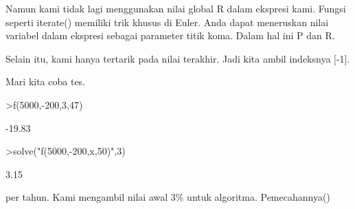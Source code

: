 \documentclass[a4paper,10pt]{article}
\begin{document}
\begin{eulernotebook}
\begin{eulercomment}
\begin{eulercomment}
\begin{eulercomment}
\begin{eulercomment}
\begin{eulercomment}
\begin{eulercomment}
\begin{eulercomment}
\begin{eulercomment}
\begin{eulercomment}
\begin{eulercomment}
\begin{eulercomment}
\begin{eulercomment}
\begin{eulercomment}
\begin{eulercomment}
\begin{eulercomment}
\begin{eulercomment}
\begin{eulercomment}
\begin{eulercomment}
\begin{eulercomment}
\begin{eulercomment}
\begin{eulercomment}
\begin{eulercomment}
\begin{eulercomment}
\begin{eulercomment}
\begin{eulercomment}
\begin{eulercomment}
\begin{eulercomment}
\begin{eulercomment}
\begin{eulercomment}
\begin{eulercomment}
\begin{eulercomment}
\begin{eulercomment}
\begin{eulercomment}
\begin{eulercomment}
\begin{eulercomment}
Namun kami tidak lagi menggunakan nilai global R dalam ekspresi kami.
Fungsi seperti iterate() memiliki trik khusus di Euler. Anda dapat
meneruskan nilai variabel dalam ekspresi sebagai parameter titik koma.
Dalam hal ini P dan R.

Selain itu, kami hanya tertarik pada nilai terakhir. Jadi kita ambil
indeksnya [-1].

Mari kita coba tes.
\end{eulercomment}
\begin{eulerprompt}
>f(5000,-200,3,47)
\end{eulerprompt}
\begin{euleroutput}
       -19.83 
\end{euleroutput}
\begin{eulerprompt}
>solve("f(5000,-200,x,50)",3)
\end{eulerprompt}
\begin{euleroutput}
         3.15 
\end{euleroutput}
\begin{eulercomment}
per tahun. Kami mengambil nilai awal 3\% untuk algoritma. Pemecahannya()


\end{eulercomment}
\end{eulercomment}
\end{eulercomment}
\end{eulercomment}
\end{eulercomment}
\end{eulercomment}
\end{eulercomment}
\end{eulercomment}
\end{eulercomment}
\end{eulercomment}
\end{eulercomment}
\end{eulercomment}
\end{eulercomment}
\end{eulercomment}
\end{eulercomment}
\end{eulercomment}
\end{eulercomment}
\end{eulercomment}
\end{eulercomment}
\end{eulercomment}
\end{eulercomment}
\end{eulercomment}
\end{eulercomment}
\end{eulercomment}
\end{eulercomment}
\end{eulercomment}
\end{eulercomment}
\end{eulercomment}
\end{eulercomment}
\end{eulercomment}
\end{eulercomment}
\end{eulercomment}
\end{eulercomment}
\end{eulercomment}
\end{eulercomment}
\end{eulernotebook}
\end{document}
